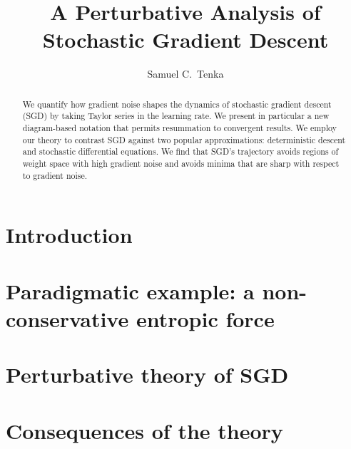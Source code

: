 



    \title{A Perturbative Analysis of Stochastic Gradient Descent}
    \author {
        Samuel C.\ Tenka \\
    }
    \maketitle
    
    \begin{abstract}
        We quantify how gradient noise shapes the dynamics of stochastic
        gradient descent (SGD) by taking Taylor series in the learning rate.
        We present in particular a new diagram-based notation that permits
        resummation to convergent results.
        We employ our theory to contrast SGD against two popular
        approximations: deterministic descent and stochastic differential
        equations.  We find that SGD's trajectory avoids regions of weight
        space with high gradient noise and avoids minima that are sharp with
        respect to gradient noise.
    \end{abstract}
    

    \section{Introduction}\label{sect:intro}
        
           
    \section{Paradigmatic example: a non-conservative entropic force}\label{sect:entropic-example}
        
      
    \section{Perturbative theory of SGD}\label{sect:calculus}
        

    \section{Consequences of the theory}\label{sect:consequences}
        
       
